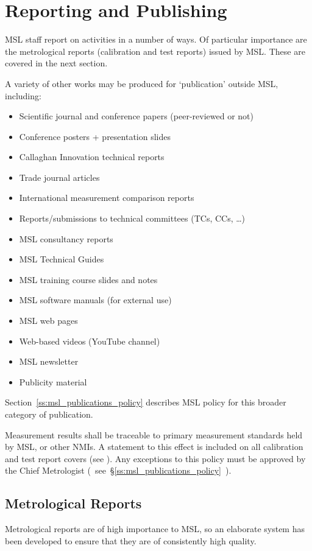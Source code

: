 \section{Reporting and Publishing}
MSL staff report on activities in a number of ways. Of particular importance are the metrological reports (calibration and test reports) issued by MSL. These are covered in the next section. 

A variety of other works may be produced for ‘publication' outside MSL, including:
\begin{itemize}
\item Scientific journal and conference papers (peer-reviewed or not)
\item Conference posters + presentation slides
\item Callaghan Innovation technical reports
\item Trade journal articles
\item International measurement comparison reports
\item Reports/submissions to technical committees (TCs, CCs, …)
\item MSL consultancy reports
\item MSL Technical Guides
\item MSL training course slides and notes
\item MSL software manuals (for external use)
\item MSL web pages
\item Web-based videos (YouTube channel)   
\item MSL newsletter
\item Publicity material
\end{itemize}

Section~\ref{ss:msl_publications_policy} describes MSL policy for this broader category of publication.

Measurement results shall be traceable to primary measurement standards held by MSL, or other NMIs. A statement to this effect is included on all calibration and test report covers (see  \cite[\S\ref*{GRP-ss:report_covers}]{MSL_Reporting_Guidelines}). Any exceptions to this policy must be approved by the Chief Metrologist (~see~\S\ref{ss:msl_publications_policy}~).

\subsection{Metrological Reports}
\label{ss:metrological_reports}
Metrological reports are of high importance to MSL, so an elaborate system has been developed to ensure that they are of consistently high quality.

